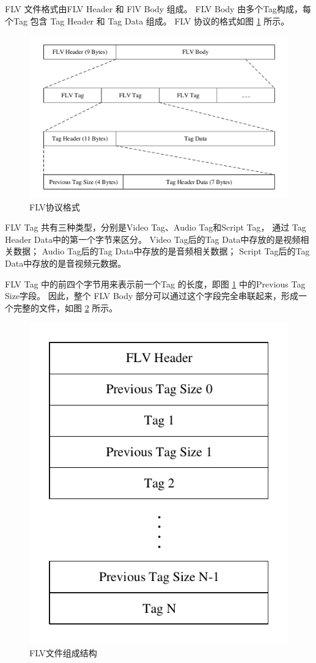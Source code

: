 FLV 文件格式由FLV Header 和 FlV Body 组成。
FLV Body 由多个Tag构成，每个Tag 包含 Tag Header 和 Tag Data 组成。
FLV 协议的格式如图 \ref{Fig:flv} 所示。

\begin{figure}[ht]
    \centering
    \includegraphics[width=0.8\linewidth]{./Figure/IMG_flv.pdf}
    \caption{FLV协议格式}
    \label{Fig:flv}
\end{figure}

FLV Tag 共有三种类型，分别是Video Tag、Audio Tag和Script Tag，
通过 Tag Header Data中的第一个字节来区分。
Video Tag后的Tag Data中存放的是视频相关数据；
Audio Tag后的Tag Data中存放的是音频相关数据；
Script Tag后的Tag Data中存放的是音视频元数据。

FLV Tag 中的前四个字节用来表示前一个Tag 的长度，即图 \ref{Fig:flv} 中的Previous Tag Size字段。
因此，整个 FLV Body 部分可以通过这个字段完全串联起来，形成一个完整的文件，如图 \ref{Fig:flv_file} 所示。

\begin{figure}[ht]
    \centering
    \includegraphics[scale=1]{./Figure/IMG_flv_file.pdf}
    \caption{FLV文件组成结构}
    \label{Fig:flv_file}
\end{figure}

